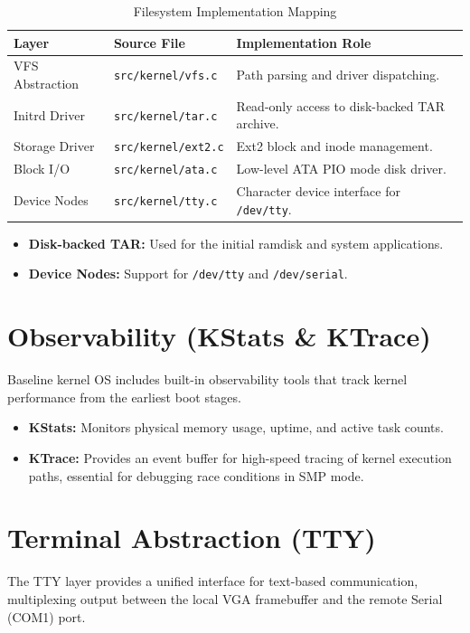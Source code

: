 \documentclass[12pt,a4paper]{report}
\begin{document}
\begin{table}[h]
\centering
\begin{tabular}{|l|l|p{6cm}|}
\hline
\textbf{Layer} & \textbf{Source File} & \textbf{Implementation Role} \\ \hline
VFS Abstraction & \texttt{src/kernel/vfs.c} & Path parsing and driver dispatching. \\ \hline
Initrd Driver & \texttt{src/kernel/tar.c} & Read-only access to disk-backed TAR archive. \\ \hline
Storage Driver & \texttt{src/kernel/ext2.c} & Ext2 block and inode management. \\ \hline
Block I/O & \texttt{src/kernel/ata.c} & Low-level ATA PIO mode disk driver. \\ \hline
Device Nodes & \texttt{src/kernel/tty.c} & Character device interface for \texttt{/dev/tty}. \\ \hline
\end{tabular}
\caption{Filesystem Implementation Mapping}
\end{table}

\begin{itemize}
    \item \textbf{Disk-backed TAR:} Used for the initial ramdisk and system applications.
    \item \textbf{Device Nodes:} Support for \texttt{/dev/tty} and \texttt{/dev/serial}.
\end{itemize}

\section{Observability (KStats \& KTrace)}
Baseline kernel OS includes built-in observability tools that track kernel performance from the earliest boot stages.
\begin{itemize}
    \item \textbf{KStats:} Monitors physical memory usage, uptime, and active task counts.
    \item \textbf{KTrace:} Provides an event buffer for high-speed tracing of kernel execution paths, essential for debugging race conditions in SMP mode.
\end{itemize}

\section{Terminal Abstraction (TTY)}
The TTY layer provides a unified interface for text-based communication, multiplexing output between the local VGA framebuffer and the remote Serial (COM1) port.
\end{document}
